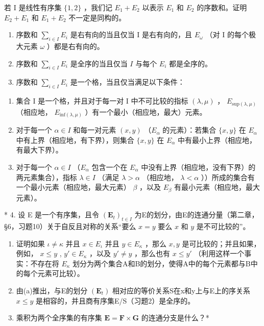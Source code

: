 若 I 是线性有序集 \(\{1, 2\}\) ，我们记 \(E_{1} + E_{2}\) 以表示 \(E_{1}\) 和 \(E_{2}\) 的序数和。证明 \(E_{2} + E_{1}\) 和 \(E_{1} + E_{2}\) 不一定是同构的。

\begin{enumerate}
\def\labelenumi{(\alph{enumi})}
\setcounter{enumi}{2}
\item
  序数和 \(\sum_{i\in I}E_i\) 是右有向的当且仅当 I 是右有向的，且 \(E_{\omega}\) （对 I 的每个极大元素 \(\omega\) ）都是右有向的。
\item
  序数和 \(\sum_{i\in I}E_i\) 是全序的当且仅当 \(I\) 与每个 \(E_i\) 都是全序的。
\item
  序数和 \(\sum_{i\in I}E_i\) 是一个格，当且仅当满足以下条件：
\end{enumerate}

\begin{enumerate}
\def\labelenumi{(\Roman{enumi})}
\item
  集合 I 是一个格，并且对于每一对 I 中不可比较的指标 \((\lambda, \mu)\) ， \(E_{\text{sup}(\lambda, \mu)}\) （相应地， \(E_{\text{inf}(\lambda, \mu)}\) ）有一个最小（相应地，最大）元素。
\item
  对于每一个 \(\alpha \in I\) 和每一对元素 \((x, y)\) （\(E_{\alpha}\) 的元素）：若集合 \(\{x, y\}\) 在 \(E_{\alpha}\) 中有上界（相应地，有下界），则集合 \(\{x, y\}\) 在 \(E_{\alpha}\) 中有最小上界（相应地，有最大下界）。
\item
  对于每一个 \(\alpha \in I\) （\(E_{\alpha}\) 包含一个在 \(E_{\alpha}\) 中没有上界（相应地，没有下界）的两元素集合），指标 \(\lambda \in I\) （满足 \(\lambda > \alpha\) （相应地， \(\lambda < \alpha\) ））所成的集合有一个最小元素（相应地，最大元素） \(\beta\) ，以及 \(E_{\beta}\) 有最小元素（相应地，最大元素）。
\end{enumerate}

* 4. 设 E 是一个有序集，且令 \((\mathbf{E}_t)_{t \in I}\) 为E的划分，由E的连通分量（第二章，§6，习题10）关于自反且对称的关系“要么 \(x = y\) 要么 \(x\) 和 \(y\) 是不可比较的”。

\begin{enumerate}
\def\labelenumi{(\alph{enumi})}
\item
  证明如果 \(\iota \neq \kappa\) 并且 \(x \in E_{\iota}\) 并且 \(y \in E_{\kappa}\) ，那么 \(x, y\) 是可比较的；并且如果，例如， \(x \leqslant y\) , \(y' \in E_{\kappa}\) ，以及 \(y' \neq y\) ，那么也有 \(x \leqslant y'\) （利用这样一个事实：不存在将 \(E_{\kappa}\) 划分为两个集合A和B的划分，使得A中的每个元素都与B中的每个元素可比较）。
\item
  由(a)推出，与E的划分 \((\mathbf{E}_{t})\) 相对应的等价关系S在x和y上与E上的序关系 \(x \leqslant y\) 是相容的，并且商有序集E/S（习题2）是全序的。
\item
  乘积为两个全序集的有序集 \(\mathbf{E} = \mathbf{F} \times \mathbf{G}\) 的连通分支是什么？*
\end{enumerate}


